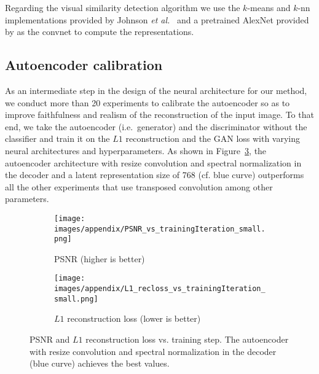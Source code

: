 \documentclass[a4paper,12pt]{report}
\begin{document}
Regarding the visual similarity detection algorithm we use the $k$-means and $k$-nn implementations provided by Johnson \textit{et al.}~\cite{FaissKnn} and a pretrained AlexNet provided by \cite{DeepCluster} as the convnet to compute the representations.


\subsection{Autoencoder calibration}\label{sec:ae_calibration}
As an intermediate step in the design of the neural architecture for our method, we conduct more than 20 experiments to calibrate the autoencoder so as to improve faithfulness and realism of the reconstruction of the input image. To that end, we take the autoencoder (i.e.\ generator) and the discriminator without the classifier and train it on the $L1$ reconstruction and the GAN loss with varying neural architectures and hyperparameters. As shown in Figure~\ref{fig:ae_calib_graphs}, the autoencoder architecture with resize convolution and spectral normalization in the decoder and a latent representation size of 768 (cf. blue curve) outperforms all the other experiments that use transposed convolution among other parameters.
\begin{figure}[h]
\centering
\begin{subfigure}{0.49\textwidth}
\texttt{[image: images/appendix/PSNR\_vs\_trainingIteration\_small.png]} 
\caption{PSNR (higher is better)}
\label{fig:ae_calib_psnr}
\end{subfigure}
\begin{subfigure}{0.49\textwidth}
\texttt{[image: images/appendix/L1\_recloss\_vs\_trainingIteration\_small.png]}
\caption{$L1$ reconstruction loss (lower is better)}
\label{fig:ae_calib_L1recloss}
\end{subfigure}
\caption{PSNR and $L1$ reconstruction loss vs. training step. The autoencoder with resize convolution and spectral normalization in the decoder (blue curve) achieves the best values.}
\label{fig:ae_calib_graphs}
\end{figure}
\end{document}
